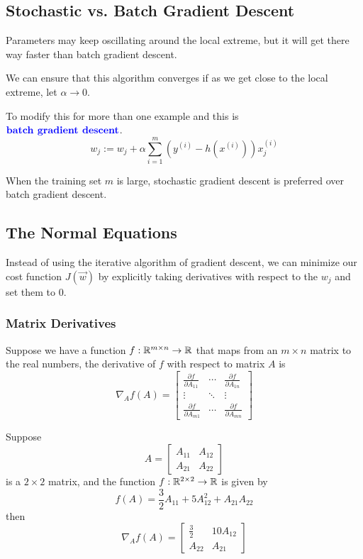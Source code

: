 \documentclass[12pt]{scrartcl}
\begin{document}
\subsection{Stochastic vs. Batch Gradient Descent}
\begin{note}
    Parameters may keep oscillating around the local extreme, but it will get there way faster than batch gradient descent.
\end{note}
\begin{note}
    We can ensure that this algorithm converges if as we get close to the local extreme, let $\alpha \to 0$.
\end{note}
\begin{definition}
    To modify this for more than one example and this is \\ $\textbf{\color{blue} batch gradient descent}$.
    \[w_j:= w_j + \alpha \sum_{i=1}^m(y^{(i)} - h(x^{(i)}))x_j^{(i)}\]
\end{definition}
\begin{note}
    When the training set $m$ is large, stochastic gradient descent is preferred over batch gradient descent.
\end{note}
\subsection{The Normal Equations}
Instead of using the iterative algorithm of gradient descent, we can minimize
our cost function $J(\vec{w})$ by explicitly taking derivatives with respect to
the $w_j$ and set them to 0.
\subsubsection{Matrix Derivatives}
Suppose we have a function $f: \mathbb R^{m \times n} \to \mathbb R$ that maps from an $m
    \times n$ matrix to the real numbers, the derivative of $f$ with respect to
matrix $A$ is $$\nabla_A f(A) = \begin{bmatrix}
        \frac{\partial f}{\partial A_{11}} & \cdots & \frac{\partial f}{\partial A_{1n}} \\ \vdots & \ddots & \vdots\\ \frac{\partial f}{\partial A_{m1}} & \cdots & \frac{\partial f}{\partial A_{mn}}
    \end{bmatrix}$$
\begin{example}
    Suppose $$A = \begin{bmatrix}
            A_{11} & A_{12} \\
            A_{21} & A_{22}
        \end{bmatrix}$$ is a $2 \times 2$ matrix, and the function $f: \mathbb R ^{2 \times 2} \to \mathbb R$ is given by
    \[f(A) = \frac{3}{2}A_{11} + 5A_{12}^2 + A_{21}A_{22}\]
    then $$\nabla_A f(A) = \begin{bmatrix}
            \frac{3}{2} & 10A_{12} \\
            A_{22}      & A_{21}
        \end{bmatrix}$$
\end{example}
\end{document}
